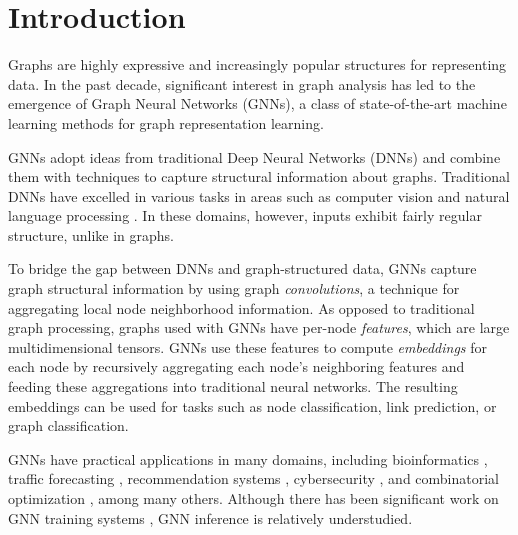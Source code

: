 \chapter{Introduction}

Graphs are highly expressive and increasingly popular structures for representing data.
In the past decade, significant interest in graph analysis has led to the emergence of Graph Neural Networks (GNNs), a class of state-of-the-art machine learning methods for graph representation learning. 

GNNs adopt ideas from traditional Deep Neural Networks (DNNs) and combine them with techniques to capture structural information about graphs. Traditional DNNs have excelled in various tasks in areas such as computer vision \cite{AlexNet_2012}\cite{YOLO_2016} and natural language processing \cite{RNN_2013}\cite{NamedEntityRecognition_2016}. In these domains, however, inputs exhibit fairly regular structure, unlike in graphs. 

To bridge the gap between DNNs and graph-structured data, GNNs capture graph structural information by using graph \textit{convolutions}, a technique for aggregating local node neighborhood information. As opposed to traditional graph processing, graphs used with GNNs have per-node \textit{features}, which are large multidimensional tensors. GNNs use these features to compute \textit{embeddings} for each node by recursively aggregating each node's neighboring features and feeding these aggregations into traditional neural networks. 
The resulting embeddings can be used for tasks such as node classification, link prediction, or graph classification.

GNNs have practical applications in many domains, including bioinformatics \cite{Bioinfo_2021} \cite{Bioinfo_2022}, 
traffic forecasting \cite{Traffic_SST-GNN_2021} \cite{Traffic_GoogleMaps_2021} \cite{Traffic_survey_2021}, recommendation systems \cite{Recsys_PinSAGE_2018} \cite{Recsys_Diffnet_2022}\cite{Recsys_LightGCN_2020}\cite{Recsys_NAGCN_2020}\cite{Recsys_SGL_2021}\cite{Recsys_Survey_2022}, 
cybersecurity \cite{Cybersec_2022} \cite{Cybersec_2023}, and combinatorial optimization \cite{CombinatorialOptimization_2019}\cite{CombinatorialOptimization_2021}, among many others. Although there has been significant work on GNN training systems \cite{P3_2021}\cite{PaGraph_2020}\cite{BGL_2023}\cite{GNNLab_2022}, GNN inference is relatively understudied. 

